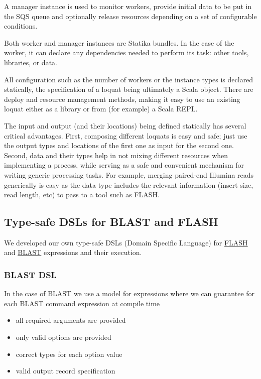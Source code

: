 \documentclass{frontiersSCNS} %
\providecommand{\tightlist}{%
\setlength{\itemsep}{0pt}\setlength{\parskip}{0pt}}
\begin{document}
A manager instance is used to monitor workers, provide initial data to
be put in the SQS queue and optionally release resources depending on a
set of configurable conditions.

Both worker and manager instances are Statika bundles. In the case of
the worker, it can declare any dependencies needed to perform its task:
other tools, libraries, or data.

All configuration such as the number of workers or the instance types is
declared statically, the specification of a loquat being ultimately a
Scala object. There are deploy and resource management methods, making
it easy to use an existing loquat either as a library or from (for
example) a Scala REPL.

The input and output (and their locations) being defined statically has
several critical advantages. First, composing different loquats is easy
and safe; just use the output types and locations of the first one as
input for the second one. Second, data and their types help in not
mixing different resources when implementing a process, while serving as
a safe and convenient mechanism for writing generic processing tasks.
For example, merging paired-end Illumina reads generically is easy as
the data type includes the relevant information (insert size, read
length, etc) to pass to a tool such as FLASH.

\subsection{Type-safe DSLs for BLAST and
FLASH}\label{type-safe-dsls-for-blast-and-flash}

We developed our own type-safe DSLs (Domain Specific Language) for
\href{https://github.com/ohnosequences/flash}{FLASH} and
\href{https://github.com/ohnosequences/blast}{BLAST} expressions and
their execution.

\subsubsection{BLAST DSL}\label{blast-dsl}

In the case of BLAST we use a model for expressions where we can
guarantee for each BLAST command expression at compile time

\begin{itemize}
\tightlist
\item
  all required arguments are provided
\item
  only valid options are provided
\item
  correct types for each option value
\item
  valid output record specification
\end{itemize}
\end{document}
